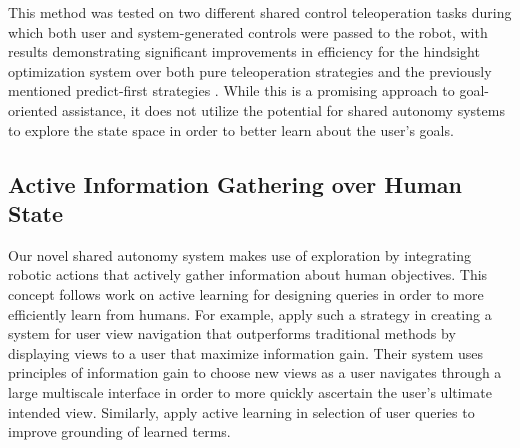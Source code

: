 \documentclass[conference]{IEEEtran}
\begin{document}
This method was tested on two different shared control teleoperation tasks during which both user and system-generated controls were passed to the robot, with results demonstrating significant improvements in efficiency for the hindsight optimization system over both pure teleoperation strategies and the previously mentioned predict-first strategies \cite{javdani2018shared}. While this is a promising approach to goal-oriented assistance, it does not utilize the potential for shared autonomy systems to explore the state space in order to better learn about the user's goals.

\subsection{Active Information Gathering over Human State}
Our novel shared autonomy system makes use of exploration by integrating robotic actions that actively gather information about human objectives. This concept follows work on active learning for designing queries in order to more efficiently learn from humans. For example, \citet{liu2017bignav} apply such a strategy in creating a system for user view navigation that outperforms traditional methods by displaying views to a user that maximize information gain. Their system uses principles of information gain to choose new views as a user navigates through a large multiscale interface in order to more quickly ascertain the user's ultimate intended view. Similarly, \citet{thomason2017opportunistic} apply active learning in selection of user queries to improve grounding of learned terms.
\end{document}
